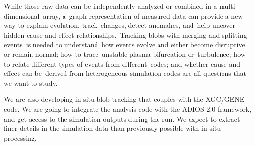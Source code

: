 While those raw data can be independently analyzed or combined in a multi-dimensional array, a graph representation of measured data can provide a new way to explain evolution, track changes, detect anomalies, and help uncover hidden cause-and-effect relationships. Tracking blobs with merging and splitting events is needed to understand how events evolve and either become disruptive or remain normal; how to trace unstable plasma bifurcation or turbulence; how to relate different types of events from different codes; and whether cause-and-effect can be derived from heterogeneous simulation codes are all questions that we want to study.

We are also developing in situ blob tracking that couples with the XGC/GENE code.  We are going to integrate the analysis code with the ADIOS 2.0 framework, and get access to the simulation outputs during the run.  We expect to extract finer details in the simulation data than previously possible with in situ processing.  
